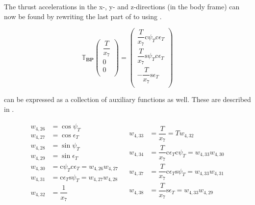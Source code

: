 \noindent
The thrust accelerations in the x-, y- and z-directions (in the body frame) can now be found by rewriting the last part of  to  using .

\begin{equation} \label{eq:aTB}
\mathbb{T}_{\mathbf{BP}}
\begin{pmatrix}
\dfrac{T}{x_{7}}\\
0\\
0\\
\end{pmatrix}
=
\begin{pmatrix}
\dfrac{T}{x_{7}}\text{c}\psi_{T}\text{c}\epsilon_{T}\\
\dfrac{T}{x_{7}}\text{s}\psi_{T}\text{c}\epsilon_{T}\\
-\dfrac{T}{x_{7}}\text{s}\epsilon_{T}\\
\end{pmatrix}
\end{equation}


\noindent
{} can be expressed as a collection of auxiliary functions as well. These are described in .

\begin{align} \label{eq:aTBAuxF}
\begin{split}
w_{4,26} &= \cos \psi_{T} \\
w_{4,27} &= \cos \epsilon_{T} \\
w_{4,28} &= \sin \psi_{T} \\
w_{4,29} &= \sin \epsilon_{T} \\
w_{4,30} &= \text{c}\psi_{T} \text{c}\epsilon_{T} = w_{4,26}w_{4,27} \\
w_{4,31} &= \text{c}\epsilon_{T} \text{s}\psi_{T} = w_{4,27}w_{4,28} \\
w_{4,32} &= \dfrac{1}{x_{7}}\\
\end{split}
&
\begin{split}
w_{4,33} &= \dfrac{T}{x_{7}} = T w_{4,32}\\
w_{4,34} &= \dfrac{T}{x_{7}} \text{c}\epsilon_{T} \text{c}\psi_{T} = w_{4,33}w_{4,30} \\
w_{4,37} &= \dfrac{T}{x_{7}}\text{c}\epsilon_{T} \text{s}\psi_{T} = w_{4,33}w_{4,31} \\
w_{4,38} &= \dfrac{T}{x_{7}} \text{s}\epsilon_{T} = w_{4,33}w_{4,29} \\
\end{split}
\end{align}

